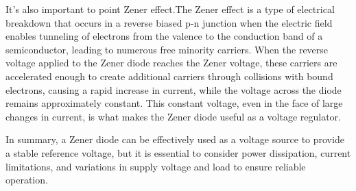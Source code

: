 \documentclass[11pt]{article}
\begin{document}
\begin{question}
{        It's also important to point Zener effect.The Zener effect is
        a type of electrical breakdown that occurs in a reverse biased
        p-n junction when the electric field enables tunneling of
        electrons from the valence to the conduction band of a
        semiconductor, leading to numerous free minority carriers.
        When the reverse voltage applied to the Zener diode reaches
        the Zener voltage, these carriers are accelerated enough to
        create additional carriers through collisions with bound
        electrons, causing a rapid increase in current, while the
        voltage across the diode remains approximately constant.
        This constant voltage,
        even in the face of large changes in current, is what makes the Zener diode useful as a voltage regulator.

        In summary, a Zener diode can be effectively used as a voltage source to
        provide a stable reference voltage,
        but it is essential to consider power dissipation, current limitations,
        and variations in supply voltage and load to ensure reliable operation.

    }

\end{question}
\end{document}
